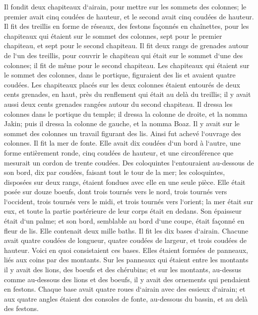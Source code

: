 \verse Il fondit deux chapiteaux d`airain, pour mettre sur les sommets des colonnes; le premier avait cinq coudées de hauteur, et le second avait cinq coudées de hauteur. 
\verse Il fit des treillis en forme de réseaux, des festons façonnés en chaînettes, pour les chapiteaux qui étaient sur le sommet des colonnes, sept pour le premier chapiteau, et sept pour le second chapiteau. 
\verse Il fit deux rangs de grenades autour de l`un des treillis, pour couvrir le chapiteau qui était sur le sommet d`une des colonnes; il fit de même pour le second chapiteau. 
\verse Les chapiteaux qui étaient sur le sommet des colonnes, dans le portique, figuraient des lis et avaient quatre coudées. 
\verse Les chapiteaux placés sur les deux colonnes étaient entourés de deux cents grenades, en haut, près du renflement qui était au delà du treillis; il y avait aussi deux cents grenades rangées autour du second chapiteau. 
\verse Il dressa les colonnes dans le portique du temple; il dressa la colonne de droite, et la nomma Jakin; puis il dressa la colonne de gauche, et la nomma Boaz. 
\verse Il y avait sur le sommet des colonnes un travail figurant des lis. Ainsi fut achevé l`ouvrage des colonnes. 
\verse Il fit la mer de fonte. Elle avait dix coudées d`un bord à l`autre, une forme entièrement ronde, cinq coudées de hauteur, et une circonférence que mesurait un cordon de trente coudées. 
\verse Des coloquintes l`entouraient au-dessous de son bord, dix par coudées, faisant tout le tour de la mer; les coloquintes, disposées sur deux rangs, étaient fondues avec elle en une seule pièce. 
\verse Elle était posée sur douze boeufs, dont trois tournés vers le nord, trois tournés vers l`occident, trois tournés vers le midi, et trois tournés vers l`orient; la mer était sur eux, et toute la partie postérieure de leur corps était en dedans. 
\verse Son épaisseur était d`un palme; et son bord, semblable au bord d`une coupe, était façonné en fleur de lis. Elle contenait deux mille baths. 
\verse Il fit les dix bases d`airain. Chacune avait quatre coudées de longueur, quatre coudées de largeur, et trois coudées de hauteur. 
\verse Voici en quoi consistaient ces bases. Elles étaient formées de panneaux, liés aux coins par des montants. 
\verse Sur les panneaux qui étaient entre les montants il y avait des lions, des boeufs et des chérubins; et sur les montants, au-dessus comme au-dessous des lions et des boeufs, il y avait des ornements qui pendaient en festons. 
\verse Chaque base avait quatre roues d`airain avec des essieux d`airain; et aux quatre angles étaient des consoles de fonte, au-dessous du bassin, et au delà des festons. 

